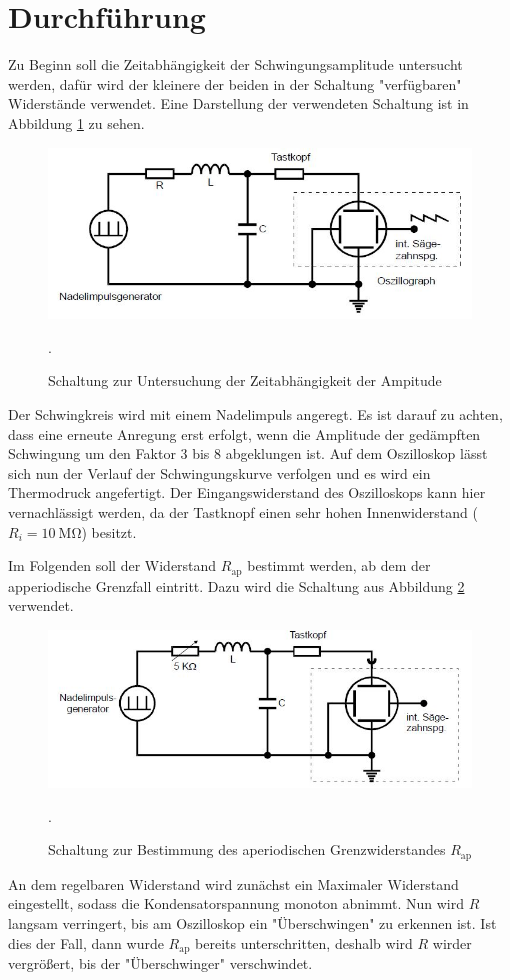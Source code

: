 \section{Durchführung}
Zu Beginn soll die Zeitabhängigkeit der Schwingungsamplitude untersucht werden, dafür
wird der kleinere der beiden in der Schaltung "verfügbaren" Widerstände verwendet.
Eine Darstellung der verwendeten Schaltung ist in Abbildung \ref{fig:a} zu sehen.
\begin{figure}[H]
  \centering
  \includegraphics[width=13cm]{a.JPG}
  \caption{Schaltung zur Untersuchung der Zeitabhängigkeit der Ampitude}
  \cite{skript}.
  \label{fig:a}
\end{figure}
Der Schwingkreis wird mit einem Nadelimpuls angeregt. Es ist darauf zu achten, dass
eine erneute Anregung erst erfolgt, wenn die Amplitude der gedämpften
Schwingung um den Faktor 3 bis 8 abgeklungen ist. Auf dem Oszilloskop lässt
sich nun der Verlauf der Schwingungskurve verfolgen und es wird ein
Thermodruck angefertigt.
Der Eingangswiderstand des Oszilloskops kann hier vernachlässigt werden, da der
Tastknopf einen sehr hohen Innenwiderstand ($R_{i}=\SI{10}{\mega\ohm}$) besitzt.

Im Folgenden soll der Widerstand $R_{\text{ap}}$ bestimmt werden, ab dem der apperiodische
Grenzfall eintritt. Dazu wird die Schaltung aus Abbildung \ref{fig:b} verwendet.
\begin{figure}[H]
  \centering
  \includegraphics[width=13cm]{b.JPG}
  \caption{Schaltung zur Bestimmung des aperiodischen Grenzwiderstandes $R_{\text{ap}}$}
  \cite{skript}.
  \label{fig:b}
\end{figure}
An dem regelbaren Widerstand wird zunächst ein Maximaler Widerstand eingestellt, sodass
die Kondensatorspannung monoton abnimmt. Nun wird $R$ langsam verringert, bis
am Oszilloskop ein "Überschwingen" zu erkennen ist. Ist dies der Fall, dann wurde
$R_{\text{ap}}$ bereits unterschritten, deshalb wird $R$ wirder vergrößert, bis der
"Überschwinger" verschwindet.

